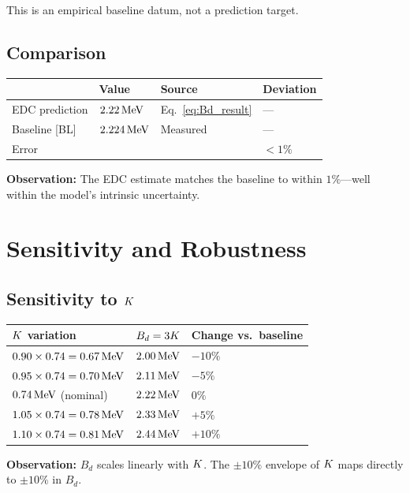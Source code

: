 This is an empirical baseline datum, not a prediction target.

\subsection{Comparison}

\begin{center}
\begin{tabular}{llll}
\toprule
& \textbf{Value} & \textbf{Source} & \textbf{Deviation} \\
\midrule
EDC prediction & $2.22\,\mathrm{MeV}$ & Eq.~\eqref{eq:Bd_result} & — \\
Baseline [BL] & $2.224\,\mathrm{MeV}$ & Measured & — \\
\midrule
Error & & & $< 1\%$ \\
\bottomrule
\end{tabular}
\end{center}

\textbf{Observation:} The EDC estimate matches the baseline to within
$1\%$---well within the model's intrinsic uncertainty.

\section{Sensitivity and Robustness}
\label{sec:d:sensitivity}

\subsection{Sensitivity to $K$}

\begin{center}
\begin{tabular}{lll}
\toprule
$K$ variation & $B_d = 3K$ & Change vs.\ baseline \\
\midrule
$0.90 \times 0.74 = 0.67\,\mathrm{MeV}$ & $2.00\,\mathrm{MeV}$ & $-10\%$ \\
$0.95 \times 0.74 = 0.70\,\mathrm{MeV}$ & $2.11\,\mathrm{MeV}$ & $-5\%$ \\
$0.74\,\mathrm{MeV}$ (nominal) & $2.22\,\mathrm{MeV}$ & $0\%$ \\
$1.05 \times 0.74 = 0.78\,\mathrm{MeV}$ & $2.33\,\mathrm{MeV}$ & $+5\%$ \\
$1.10 \times 0.74 = 0.81\,\mathrm{MeV}$ & $2.44\,\mathrm{MeV}$ & $+10\%$ \\
\bottomrule
\end{tabular}
\end{center}

\textbf{Observation:} $B_d$ scales linearly with $K$. The $\pm 10\%$
envelope of $K$ maps directly to $\pm 10\%$ in $B_d$.

